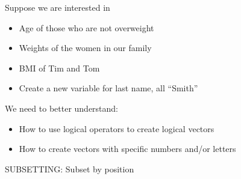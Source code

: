 \documentclass{beamer}\usepackage[]{graphicx}\usepackage[]{color}
\theoremstyle{mystyle}
\begin{document}
\begin{frame}[fragile]{Suppose we are interested in}
\begin{itemize}
\item Age of those who are not overweight
\item Weights of the women in our family
\item BMI of Tim and Tom
\item Create a new variable for last name, all “Smith” 
\end{itemize}
\end{frame}

\begin{frame}[fragile]{We need to better understand:}
\begin{itemize}
\item How to use logical operators to create logical vectors
\item How to create vectors with specific numbers and/or letters
\end{itemize}
\end{frame}

\begin{frame}[fragile]{SUBSETTING: Subset by position}
\begin{center}
    {{\resizebox*{1.1\textwidth}{1.1\textheight}
        {}} \par}
  \end{center}
\end{frame}
\end{document}
